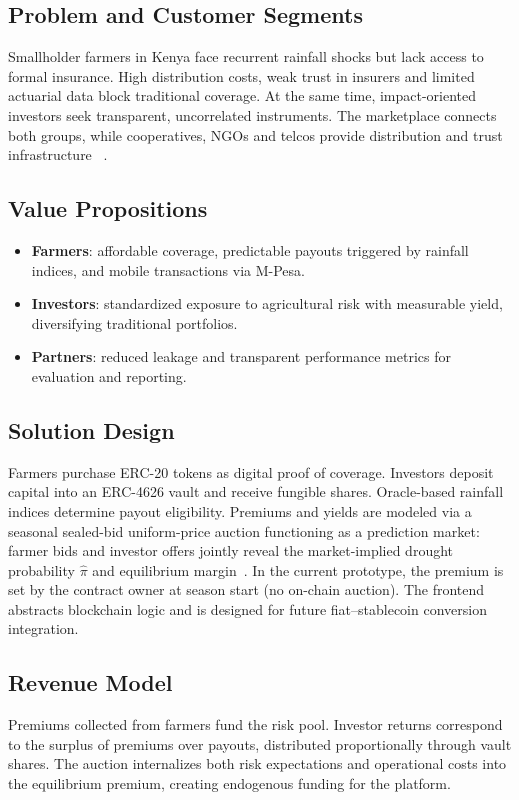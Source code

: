 \documentclass[11pt,a4paper]{article}
\begin{document}
		\subsection{Problem and Customer Segments}\label{subsec:problem-and-customer-segments}
		Smallholder farmers in Kenya face recurrent rainfall shocks but lack access to formal insurance.
		High distribution costs, weak trust in insurers and limited actuarial data block traditional coverage.
		At the same time, impact-oriented investors seek transparent, uncorrelated instruments.
		The marketplace connects both groups, while cooperatives, NGOs and telcos provide distribution and trust infrastructure ~\parencite{cole2013barriers}.

		\subsection{Value Propositions}\label{subsec:value-propositions}
		\begin{itemize}
			\item \textbf{Farmers}: affordable coverage, predictable payouts triggered by rainfall indices, and mobile transactions via M-Pesa.
			\item \textbf{Investors}: standardized exposure to agricultural risk with measurable yield, diversifying traditional portfolios.
			\item \textbf{Partners}: reduced leakage and transparent performance metrics for evaluation and reporting.
		\end{itemize}

		\subsection{Solution Design}\label{subsec:solution-design}
		Farmers purchase ERC-20 tokens as digital proof of coverage.
		Investors deposit capital into an ERC-4626 vault and receive fungible shares.
		Oracle-based rainfall indices determine payout eligibility.
		Premiums and yields are modeled via a seasonal sealed-bid uniform-price auction functioning as a prediction market: farmer bids and investor offers jointly reveal the market-implied drought probability $\hat{\pi}$ and equilibrium margin~\parencite{hanson2003market,wolfers2004prediction}. In the current prototype, the premium is set by the contract owner at season start (no on-chain auction).
		The frontend abstracts blockchain logic and is designed for future fiat--stablecoin conversion integration.

		\subsection{Revenue Model}\label{subsec:revenue-model}
		Premiums collected from farmers fund the risk pool.
		Investor returns correspond to the surplus of premiums over payouts, distributed proportionally through vault shares.
		The auction internalizes both risk expectations and operational costs into the equilibrium premium, creating endogenous funding for the platform.
\end{document}
